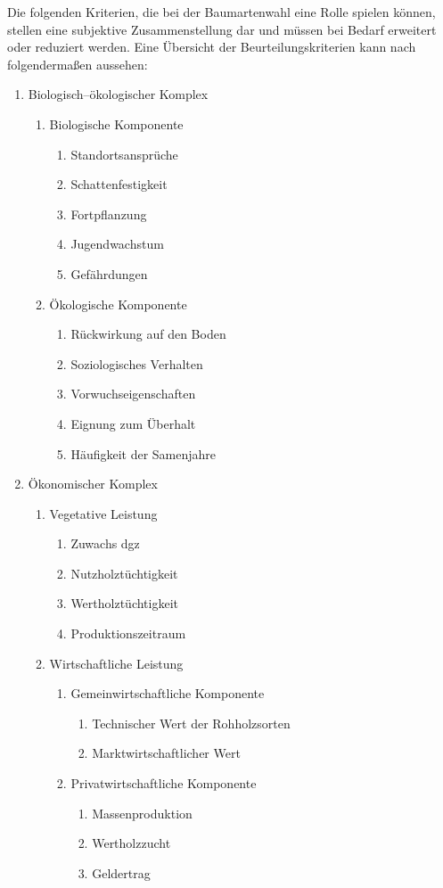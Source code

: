 \documentclass[twocolumn]{scrartcl}
\begin{document}
Die folgenden Kriterien, die bei der Baumartenwahl eine Rolle spielen können,
stellen eine subjektive Zusammenstellung dar und müssen bei Bedarf erweitert
oder reduziert werden. Eine Übersicht der Beurteilungskriterien kann nach
\citet[Bd.~1, S.~108]{bauer1962WaldbauAlsWissenschaft} folgendermaßen aussehen:
\begin{enumerate}
\item Biologisch--ökologischer Komplex
  \begin{enumerate}
  \item Biologische Komponente
    \begin{enumerate}
    \item Standortsansprüche
    \item Schattenfestigkeit
    \item Fortpflanzung
    \item Jugendwachstum
    \item Gefährdungen
    \end{enumerate}
  \item Ökologische Komponente
    \begin{enumerate}
    \item Rückwirkung auf den Boden
    \item Soziologisches Verhalten
    \item Vorwuchseigenschaften
    \item Eignung zum Überhalt
    \item Häufigkeit der Samenjahre
    \end{enumerate}
  \end{enumerate}
\item Ökonomischer Komplex
  \begin{enumerate}
  \item Vegetative Leistung
    \begin{enumerate}
    \item Zuwachs dgz
    \item Nutzholztüchtigkeit
    \item Wertholztüchtigkeit
    \item Produktionszeitraum
    \end{enumerate}
  \item Wirtschaftliche Leistung
    \begin{enumerate}
    \item Gemeinwirtschaftliche Komponente
      \begin{enumerate}
      \item Technischer Wert der Rohholzsorten
      \item Marktwirtschaftlicher Wert
      \end{enumerate}
    \item Privatwirtschaftliche Komponente
      \begin{enumerate}
      \item Massenproduktion
      \item Wertholzzucht
      \item Geldertrag
      \end{enumerate}
    \end{enumerate}
  \end{enumerate}
\end{enumerate}
\end{document}

